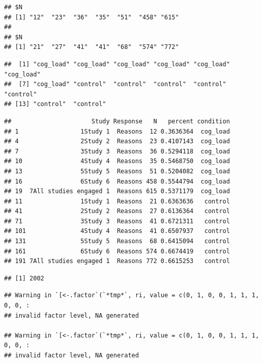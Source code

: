 \documentclass[
  american,
  man,floatsintext]{apa7}
\begin{document}
\begin{verbatim}
## $N
## [1] "12"  "23"  "36"  "35"  "51"  "458" "615"
## 
## $N
## [1] "21"  "27"  "41"  "41"  "68"  "574" "772"
\end{verbatim}

\begin{verbatim}
##  [1] "cog_load" "cog_load" "cog_load" "cog_load" "cog_load" "cog_load"
##  [7] "cog_load" "control"  "control"  "control"  "control"  "control" 
## [13] "control"  "control"
\end{verbatim}

\begin{verbatim}
##                      Study Response   N   percent condition
## 1                 1Study 1  Reasons  12 0.3636364  cog_load
## 4                 2Study 2  Reasons  23 0.4107143  cog_load
## 7                 3Study 3  Reasons  36 0.5294118  cog_load
## 10                4Study 4  Reasons  35 0.5468750  cog_load
## 13                5Study 5  Reasons  51 0.5204082  cog_load
## 16                6Study 6  Reasons 458 0.5544794  cog_load
## 19  7All studies engaged 1  Reasons 615 0.5371179  cog_load
## 11                1Study 1  Reasons  21 0.6363636   control
## 41                2Study 2  Reasons  27 0.6136364   control
## 71                3Study 3  Reasons  41 0.6721311   control
## 101               4Study 4  Reasons  41 0.6507937   control
## 131               5Study 5  Reasons  68 0.6415094   control
## 161               6Study 6  Reasons 574 0.6674419   control
## 191 7All studies engaged 1  Reasons 772 0.6615253   control
\end{verbatim}

\begin{verbatim}
## [1] 2002
\end{verbatim}

\begin{verbatim}
## Warning in `[<-.factor`(`*tmp*`, ri, value = c(0, 1, 0, 0, 1, 1, 1, 0, 0, :
## invalid factor level, NA generated

## Warning in `[<-.factor`(`*tmp*`, ri, value = c(0, 1, 0, 0, 1, 1, 1, 0, 0, :
## invalid factor level, NA generated
\end{verbatim}
\end{document}
